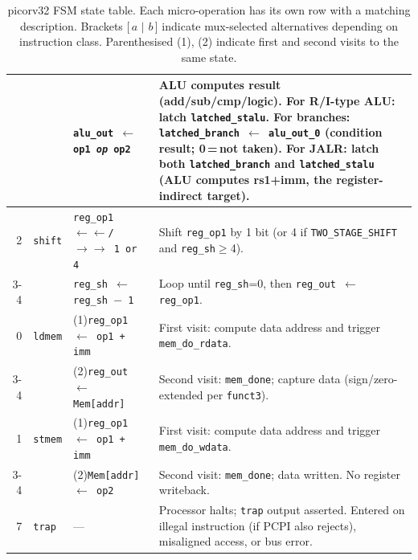 \documentclass[9pt, a4paper]{extarticle}
\newcommand{\strutrow}{\rule{0pt}{2.2ex}}
\begin{document}
\begin{table}[htbp]
{\begin{tabular}{@{}r l l p{6.5cm}@{}}
    & & \strutrow\texttt{alu\_out $\leftarrow$ op1 \textit{op} op2}
        & ALU computes result (add/sub/cmp/logic). For R/I-type ALU: latch \texttt{latched\_stalu}. For branches: \texttt{latched\_branch $\leftarrow$ alu\_out\_0} (condition result; 0\,=\,not taken). For JALR: latch both \texttt{latched\_branch} and \texttt{latched\_stalu} (ALU computes rs1+imm, the register-indirect target). \\[4pt]
    \midrule
    2 & \texttt{shift}
        & \strutrow\texttt{reg\_op1 $\leftarrow\!\!\leftarrow$/$\rightarrow\!\!\rightarrow$ 1 or 4}
        & Shift \texttt{reg\_op1} by 1 bit (or 4 if \texttt{TWO\_STAGE\_SHIFT} and \texttt{reg\_sh}$\geq$4). \\[4pt]
    \cline{3-4}
    & & \strutrow\texttt{reg\_sh $\leftarrow$ reg\_sh $-$ 1}
        & Loop until \texttt{reg\_sh}=0, then \texttt{reg\_out $\leftarrow$ reg\_op1}. \\[4pt]
    \midrule
    0 & \texttt{ldmem}
        & \strutrow(1)\;\texttt{reg\_op1 $\leftarrow$ op1 + imm}
        & First visit: compute data address and trigger \texttt{mem\_do\_rdata}. \\[4pt]
    \cline{3-4}
    & & \strutrow(2)\;\texttt{reg\_out $\leftarrow$ Mem[addr]}
        & Second visit: \texttt{mem\_done}; capture data (sign/zero-extended per \texttt{funct3}). \\[4pt]
    \midrule
    1 & \texttt{stmem}
        & \strutrow(1)\;\texttt{reg\_op1 $\leftarrow$ op1 + imm}
        & First visit: compute data address and trigger \texttt{mem\_do\_wdata}. \\[4pt]
    \cline{3-4}
    & & \strutrow(2)\;\texttt{Mem[addr] $\leftarrow$ op2}
        & Second visit: \texttt{mem\_done}; data written. No register writeback. \\[4pt]
    \midrule
    7 & \texttt{trap}
        & \strutrow---
        & Processor halts; \texttt{trap} output asserted. Entered on illegal instruction (if PCPI also rejects), misaligned access, or bus error. \\[4pt]
    \bottomrule
\end{tabular}}
\caption{picorv32 FSM state table. Each micro-operation has its own row with a matching description. Brackets [\,$a$ $|$ $b$\,] indicate mux-selected alternatives depending on instruction class. Parenthesised (1), (2) indicate first and second visits to the same state.}
\label{tab:picorv32-states}
\end{table}
\end{document}
